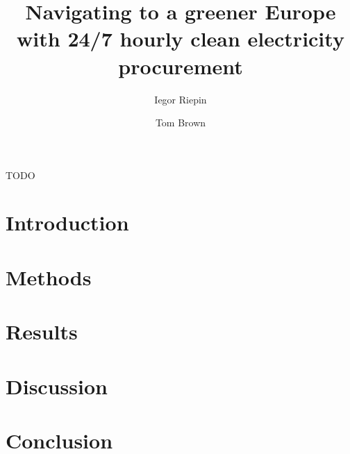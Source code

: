\documentclass[11pt, 5p, nopreprintline]{elsarticle}
\begin{document}
\begin{frontmatter}

	\title{Navigating to a greener Europe with 24/7 hourly clean electricity procurement}
    
	\author[tubaddress]{Iegor Riepin}
	\author[tubaddress]{Tom Brown} 
	
	\address[tubaddress]{Department of Digital Transformation in Energy Systems, TU Berlin, Germany}

	\begin{abstract}
		
	\end{abstract}

	\begin{keyword}
		TODO
	\end{keyword}


\end{frontmatter}

\tableofcontents

\section{Introduction}
\label{sec:intro}


\section{Methods}
\label{sec:methods}


\newpage

\section{Results}
\label{sec:results}


\section{Discussion}
\label{sec:discussion}


\section{Conclusion}
\label{sec:conclusion}

\end{document}
